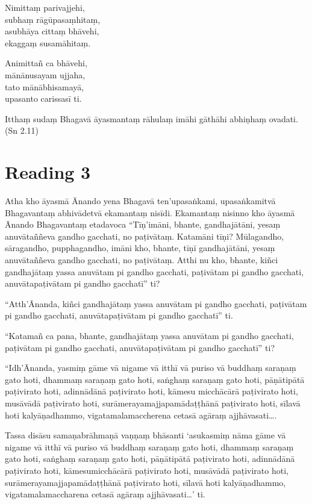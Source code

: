 Nimittaṃ parivajjehi,\\
subhaṃ rāgūpasaṃhitaṃ,\\
asubhāya cittaṃ bhāvehi,\\
ekaggaṃ susamāhitaṃ.

Animittañ ca bhāvehi,\\
mānānusayam ujjaha,\\
tato mānābhisamayā,\\
upasanto carissasī ti.

Itthaṃ sudaṃ Bhagavā āyasmantaṃ rāhulaṃ imāhi gāthāhi abhiṇhaṃ ovadati. \hfill(Sn 2.11)

\section*{Reading 3}

Atha kho āyasmā Ānando yena Bhagavā ten’upasaṅkami, upasaṅkamitvā Bhagavantaṃ abhivādetvā ekamantaṃ nisīdi. Ekamantaṃ nisinno kho āyasmā Ānando Bhagavantaṃ etadavoca “Tīṇ’imāni, bhante, gandhajātāni, yesaṃ anuvātaññeva gandho gacchati, no paṭivātaṃ. Katamāni tīṇi? Mūlagandho, sāragandho, pupphagandho, imāni kho, bhante, tīṇī gandhajātāni, yesaṃ anuvātaññeva gandho gacchati, no paṭivātaṃ. Atthi nu kho, bhante, kiñci gandhajātaṃ yassa anuvātam pi gandho gacchati, paṭivātam pi gandho gacchati, anuvātapaṭivātam pi gandho gacchatī” ti?

“Atth’Ānanda, kiñci gandhajātaṃ yassa anuvātam pi gandho gacchati, paṭivātam pi gandho gacchati, anuvātapaṭivātam pi gandho gacchatī” ti.

“Katamañ ca pana, bhante, gandhajātaṃ yassa anuvātam pi gandho gacchati, paṭivātam pi gandho gacchati, anuvātapaṭivātam pi gandho gacchatī” ti?

“Idh’Ānanda, yasmiṃ gāme vā nigame vā itthī vā puriso vā buddhaṃ saraṇaṃ gato hoti, dhammaṃ saraṇaṃ gato hoti, saṅghaṃ saraṇaṃ gato hoti, pāṇātipātā paṭivirato hoti, adinnādānā paṭivirato hoti, kāmesu micchācārā paṭivirato hoti, musāvādā paṭivirato hoti, surāmerayamajjapamādaṭṭhānā paṭivirato hoti, sīlavā hoti kalyāṇadhammo, vigatamalamaccherena cetasā agāraṃ ajjhāvasati….

Tassa disāsu samaṇabrāhmaṇā vaṇṇaṃ bhāsanti ‘asukasmiṃ nāma gāme vā nigame vā itthī vā puriso vā buddhaṃ saraṇaṃ gato hoti, dhammaṃ saraṇaṃ gato hoti, saṅghaṃ saraṇaṃ gato hoti, pāṇātipātā paṭivirato hoti, adinnādānā paṭivirato hoti, kāmesumicchācārā paṭivirato hoti, musāvādā paṭivirato hoti, surāmerayamajjapamādaṭṭhānā paṭivirato hoti, sīlavā hoti kalyāṇadhammo, vigatamalamaccharena cetasā agāraṃ ajjhāvasati…’ ti.


